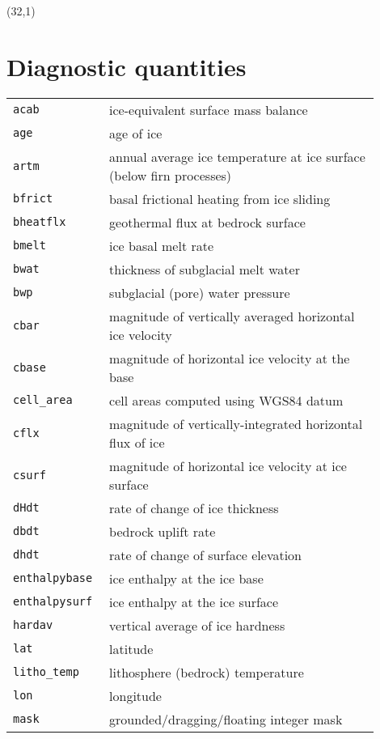 \documentclass[landscape]{article}
\begin{document}
\begin{textblock}{15}(32,1)
\section{Diagnostic quantities}
\label{sec:diagnostics}
\begin{tabular}{@{}p{0.2\linewidth}p{0.7\linewidth}@{}}
  \texttt{acab} &  ice-equivalent surface mass balance\\
  \texttt{age} &  age of ice \\
  \texttt{artm} &  annual average ice temperature at ice surface (below firn processes)\\
  \texttt{bfrict} &  basal frictional heating from ice sliding \\
  \texttt{bheatflx} &  geothermal flux at bedrock surface \\
  \texttt{bmelt} &  ice basal melt rate\\
  \texttt{bwat} &  thickness of subglacial melt water \\
  \texttt{bwp} &  subglacial (pore) water pressure \\
  \texttt{cbar} &  magnitude of vertically averaged horizontal ice velocity \\
  \texttt{cbase} &  magnitude of horizontal ice velocity at the base\\
  \texttt{cell_area} & cell areas computed using WGS84 datum\\
  \texttt{cflx} &  magnitude of vertically-integrated horizontal flux of ice \\
  \texttt{csurf} &  magnitude of horizontal ice velocity at ice surface \\
  \texttt{dHdt} &  rate of change of ice thickness \\
  \texttt{dbdt} &  bedrock uplift rate \\
  \texttt{dhdt} &  rate of change of surface elevation \\
  \texttt{enthalpybase} &  ice enthalpy at the ice base\\
  \texttt{enthalpysurf} &  ice enthalpy at the ice surface\\
  \texttt{hardav} &  vertical average of ice hardness \\
  \texttt{lat} &  latitude \\
  \texttt{litho_temp} &  lithosphere (bedrock) temperature\\
  \texttt{lon} &  longitude \\
  \texttt{mask} &  grounded/dragging/floating integer mask \\

\end{tabular}
\end{textblock}
\end{document}
